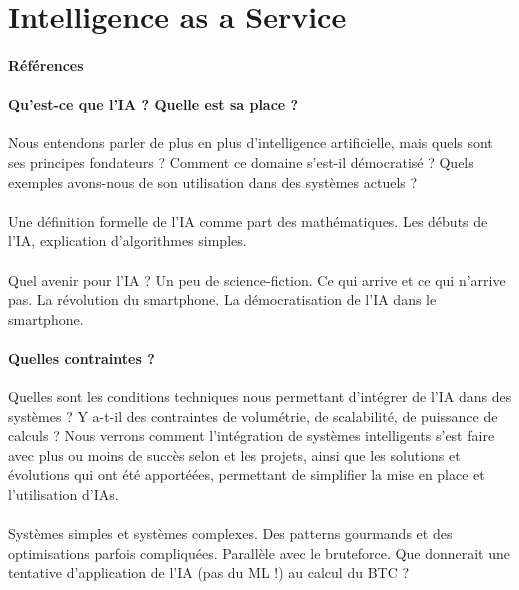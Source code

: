 \section{Intelligence as a Service}
\paragraph{Références} 

\paragraph{Qu'est-ce que l'IA ? Quelle est sa place ?} Nous entendons parler
de plus en plus d'intelligence artificielle, mais quels sont ses principes
fondateurs ? Comment ce domaine s'est-il démocratisé ? Quels exemples avons-nous
de son utilisation dans des systèmes actuels ?

\paragraph{} Une définition formelle de l'IA comme part des mathématiques.
Les débuts de l'IA, explication d'algorithmes simples.

\paragraph{} Quel avenir pour l'IA ? Un peu de science-fiction. Ce qui arrive et ce qui 
n'arrive pas. La révolution du smartphone. La démocratisation de l'IA dans le smartphone.

\paragraph{Quelles contraintes ?} Quelles sont les conditions techniques nous
permettant d'intégrer de l'IA dans des systèmes ? Y a-t-il des contraintes de
volumétrie, de scalabilité, de puissance de calculs ? Nous verrons comment
l'intégration de systèmes intelligents s'est faire avec plus ou moins de succès
selon et les projets, ainsi que les solutions et évolutions qui ont été apportéées,
permettant de simplifier la mise en place et l'utilisation d'IAs.

\paragraph{} Systèmes simples et systèmes complexes. Des patterns gourmands et
des optimisations parfois compliquées. Parallèle avec le bruteforce. Que donnerait 
une tentative d'application de l'IA (pas du ML !) au calcul du BTC ?

